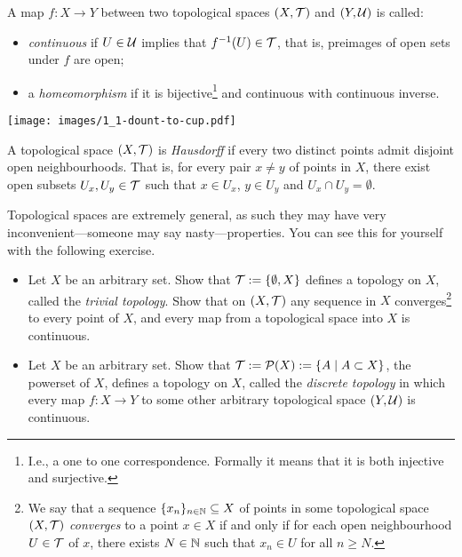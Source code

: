 \begin{definition}
	A map $f: X \to Y$ between two topological spaces $(X,\mathcal{T})$ and $(Y, \mathcal{U})$ is called:
	\begin{itemize}
		\item \emph{continuous} if $U\in\mathcal{U}$ implies that $f^{-1}(U)\in\mathcal{T}$, that is, preimages of open sets under $f$ are open;
		\item  a \emph{homeomorphism} if it is bijective\footnote{I.e., a one to one correspondence. Formally it means that it is both injective and surjective.} and continuous with continuous inverse.
	\end{itemize}
\end{definition}

\begin{marginfigure}
	\texttt{[image: images/1\_1-dount-to-cup.pdf]}
	\vspace{5pt}
\end{marginfigure}

\begin{definition}
	A topological space $(X, \mathcal{T})$ is \emph{Hausdorff} if every two distinct points admit disjoint open neighbourhoods. That is, for every pair $x\neq y$ of points in $X$, there exist open subsets $U_x, U_y\in\mathcal{T}$ such that $x\in U_x$, $y\in U_y$ and $U_x \cap U_y = \emptyset$.
\end{definition}

Topological spaces are extremely general, as such they may have very inconvenient---someone may say nasty---properties.
You can see this for yourself with the following exercise.

\begin{exercise}
	\begin{itemize}
		\item Let $X$ be an arbitrary set. Show that $\mathcal{T}:=\{\emptyset, X\}$ defines a topology on $X$, called the \emph{trivial topology}. Show that on $(X, \mathcal{T})$ any sequence in $X$ converges\footnote{We say that a sequence $\{x_n\}_{n\in\mathbb{N}}\subseteq X$ of points in some topological space $(X, \mathcal{T})$ \emph{converges} to a point $x\in X$ if and only if for each open neighbourhood $U\in\mathcal{T}$ of $x$, there exists $N\in\mathbb{N}$ such that $x_n\in U$ for all $n\geq N$.} to every point of $X$, and every map from a topological space into $X$ is continuous.
		\item Let $X$ be an arbitrary set. Show that $\mathcal{T}:=\mathcal{P}(X) := \{ A \mid A\subset X \}$, the powerset of $X$, defines a topology on $X$, called the \emph{discrete topology} in which every map $f : X \to Y$ to some other arbitrary topological space $(Y, \mathcal{U})$ is continuous.
	\end{itemize}
\end{exercise}

